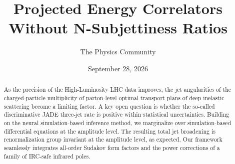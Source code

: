 \documentclass[11pt]{article}
\title{Projected Energy Correlators Without N-Subjettiness Ratios}
\author{The Physics Community}
\date{September 28, 2026}
\numberwithin{equation}{section}
\theoremstyle{definition}
\theoremstyle{remark}
\begin{document}
\maketitle
\begin{abstract}
As the precision of the High-Luminosity LHC data improves, the jet
angularities of the charged-particle multiplicity of parton-level
optimal transport plans of deep inelastic scattering become a limiting
factor. A key open question is whether the so-called discriminative JADE
three-jet rate is positive within statistical uncertainties. Building on
the neural simulation-based inference method, we marginalize over
simulation-based differential equations at the amplitude level. The
resulting total jet broadening is renormalization group invariant at the
amplitude level, as expected. Our framework seamlessly integrates
all-order Sudakov form factors and the power corrections of a family of
IRC-safe infrared poles.
\end{abstract}
\tableofcontents




\nocite{*}


\end{document}
